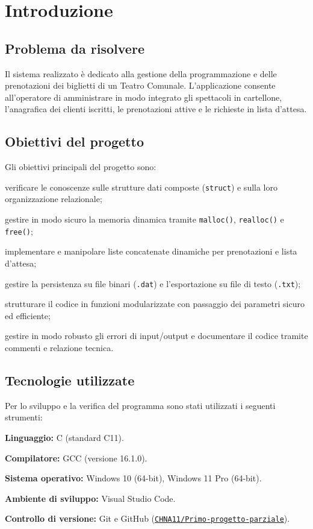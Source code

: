 \documentclass[11pt,a4paper,oneside,openany]{book}
\newenvironment{listacomp}{%
    \small
    \begin{list}{\textendash}{%
        \setlength{\topsep}{2pt}%
        \setlength{\partopsep}{0pt}%
        \setlength{\itemsep}{1pt}%
        \setlength{\parsep}{0pt}%
        \setlength{\leftmargin}{1.2em}%
    }%
}{%
    \end{list}%
}
\begin{document}
\tableofcontents
\clearpage

\chapter{Introduzione}

\section{Problema da risolvere}
Il sistema realizzato è dedicato alla gestione della programmazione e delle prenotazioni dei biglietti di un Teatro Comunale. L'applicazione consente all'operatore di amministrare in modo integrato gli spettacoli in cartellone, l'anagrafica dei clienti iscritti, le prenotazioni attive e le richieste in lista d'attesa.

\section{Obiettivi del progetto}
Gli obiettivi principali del progetto sono:
\begin{listacomp}
    \item verificare le conoscenze sulle strutture dati composte (\texttt{struct}) e sulla loro organizzazione relazionale;
    \item gestire in modo sicuro la memoria dinamica tramite \texttt{malloc()}, \texttt{realloc()} e \texttt{free()};
    \item implementare e manipolare liste concatenate dinamiche per prenotazioni e lista d'attesa;
    \item gestire la persistenza su file binari (\texttt{.dat}) e l'esportazione su file di testo (\texttt{.txt});
    \item strutturare il codice in funzioni modularizzate con passaggio dei parametri sicuro ed efficiente;
    \item gestire in modo robusto gli errori di input/output e documentare il codice tramite commenti e relazione tecnica.
\end{listacomp}

\section{Tecnologie utilizzate}
Per lo sviluppo e la verifica del programma sono stati utilizzati i seguenti strumenti:
\begin{listacomp}
    \item \textbf{Linguaggio:} C (standard C11).
    \item \textbf{Compilatore:} GCC (versione 16.1.0).
    \item \textbf{Sistema operativo:} Windows 10 (64-bit), Windows 11 Pro (64-bit).
    \item \textbf{Ambiente di sviluppo:} Visual Studio Code.
    \item \textbf{Controllo di versione:} Git e GitHub (\href{https://github.com/CHNA11/Primo-progetto-parziale}{\texttt{CHNA11/Primo-progetto-parziale}}).
\end{listacomp}
\end{document}
